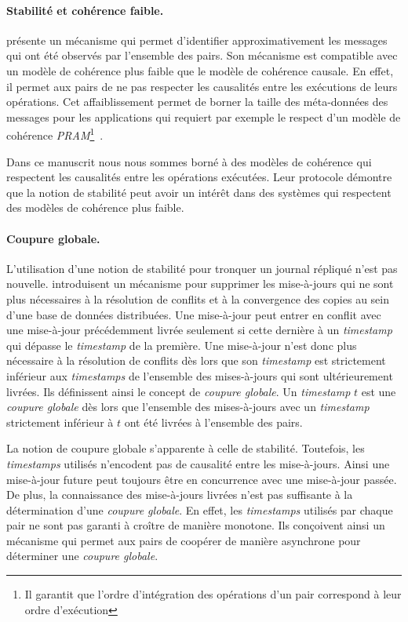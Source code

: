 \paragraph{Stabilité et cohérence faible.} \textcite{golding_1992_ackvector} présente un mécanisme qui permet d'identifier approximativement les messages qui ont été observés par l'ensemble des pairs.
Son mécanisme est compatible avec un modèle de cohérence plus faible que le modèle de cohérence causale.
En effet, il permet aux pairs de ne pas respecter les causalités entre les exécutions de leurs opérations.
Cet affaiblissement permet de borner la taille des méta-données des messages pour les applications qui requiert par exemple le respect d'un modèle de cohérence \emph{PRAM}\footnote{Il garantit que l'ordre d'intégration des opérations d'un pair correspond à leur ordre d'exécution}~\autocite{viotti_consistency_2016}.

Dans ce manuscrit nous nous sommes borné à des modèles de cohérence qui respectent les causalités entre les opérations exécutées.
Leur protocole démontre que la notion de stabilité peut avoir un intérêt dans des systèmes qui respectent des modèles de cohérence plus faible.

\paragraph{Coupure globale.} L'utilisation d'une notion de stabilité pour tronquer un journal répliqué n'est pas nouvelle.
\textcite{sarin_1987_discarding} introduisent un mécanisme pour supprimer les mise-à-jours qui ne sont plus nécessaires à la résolution de conflits et à la convergence des copies au sein d'une base de données distribuées.
Une mise-à-jour peut entrer en conflit avec une mise-à-jour précédemment livrée seulement si cette dernière à un \emph{timestamp} qui dépasse le \emph{timestamp} de la première.
Une mise-à-jour n'est donc plus nécessaire à la résolution de conflits dès lors que son \emph{timestamp} est strictement inférieur aux \emph{timestamps} de l'ensemble des mises-à-jours
qui sont ultérieurement livrées.
Ils définissent ainsi le concept de \emph{coupure globale}.
Un \emph{timestamp} $t$ est une \emph{coupure globale} dès lors que l'ensemble des mises-à-jours avec un \emph{timestamp} strictement inférieur à $t$ ont été livrées à l'ensemble des pairs.

La notion de coupure globale s'apparente à celle de stabilité.
Toutefois, les \emph{timestamps} utilisés n'encodent pas de causalité entre les mise-à-jours.
Ainsi une mise-à-jour future peut toujours être en concurrence avec une mise-à-jour passée.
De plus, la connaissance des mise-à-jours livrées n'est pas suffisante à la détermination d'une \emph{coupure globale}.
En effet, les \emph{timestamps} utilisés par chaque pair ne sont pas garanti à croître de manière monotone.
Ils conçoivent ainsi un mécanisme qui permet aux pairs de coopérer de manière asynchrone pour déterminer une \emph{coupure globale}.

